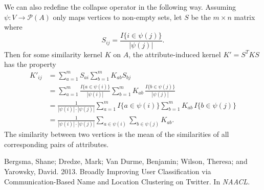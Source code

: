 \documentclass[11pt, oneside, fleqn]{article}   	%
\theoremstyle{plain}
\newcommand{\powerset}{\mathcal{P}}
\begin{document}
We can also redefine the collapse operator in the following way.  Assuming $\psi : V \rightarrow \powerset(A)$ only maps vertices to non-empty sets, let $S$ be the $m \times n$ matrix where 
$$S_{ij} = \frac{I\{i \in \psi(j)\}}{|\psi(j)|}.$$
Then for some similarity kernel $K$ on $A$, the attribute-induced kernel $K' = S^T K S$ has the property
\begin{align*}
K'_{ij} & = \sum_{a=1}^m S_{ai} \sum_{b=1}^m K_{ab} S_{bj} \\
& = \sum_{a=1}^m \frac{I\{a \in \psi(i)\}}{|\psi(i)|} \sum_{b=1}^m K_{ab} \, \frac{I\{b \in \psi(j)\}}{|\psi(j)|} \\
& = \frac{1}{|\psi(i)| \cdot |\psi(j)|} \sum_{a=1}^m I\{a \in \psi(i)\} \sum_{b=1}^m K_{ab} \, I\{b \in \psi(j)\} \\
& = \frac{1}{|\psi(i)| \cdot |\psi(j)|} \sum_{a \in \psi(i)} \sum_{b \in \psi(j)} K_{ab}.
\end{align*}
The similarity between two vertices is the mean of the similarities of all corresponding pairs of attributes.

\begin{thebibliography}{1}
Bergsma, Shane; Dredze, Mark; Van Durme, Benjamin; Wilson, Theresa; and Yarowsky, David.  2013.  Broadly Improving User Classification via Communication-Based Name and Location Clustering on Twitter.  In \textit{NAACL}.
\end{thebibliography}
\end{document}
